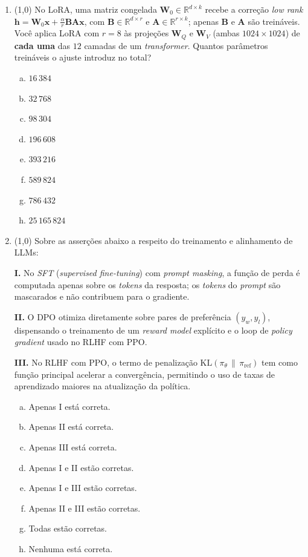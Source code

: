\documentclass[11pt,a4paper]{article}
\begin{document}
\begin{enumerate}[1)]

\item (1{,}0) No LoRA, uma matriz congelada $\mathbf{W}_0 \in \mathbb{R}^{d \times k}$ recebe a correção \textit{low rank} $\mathbf{h} = \mathbf{W}_0 \mathbf{x} + \frac{\alpha}{r} \mathbf{B} \mathbf{A} \mathbf{x}$, com $\mathbf{B} \in \mathbb{R}^{d \times r}$ e $\mathbf{A} \in \mathbb{R}^{r \times k}$; apenas $\mathbf{B}$ e $\mathbf{A}$ são treináveis. Você aplica LoRA com $r = 8$ às projeções $\mathbf{W}_Q$ e $\mathbf{W}_V$ (ambas $1024 \times 1024$) de \textbf{cada uma} das $12$ camadas de um \textit{transformer}. Quantos parâmetros treináveis o ajuste introduz no total?

\begin{enumerate}[a)]
    \item $16\,384$
    \item $32\,768$
    \item $98\,304$
    \item $196\,608$
    \item $393\,216$
    \item $589\,824$
    \item $786\,432$
    \item $25\,165\,824$
\end{enumerate}

\pagebreak
\item (1{,}0) Sobre as asserções abaixo a respeito do treinamento e alinhamento de LLMs:

\textbf{I.} No \textit{SFT} (\textit{supervised fine-tuning}) com \textit{prompt masking}, a função de perda é computada apenas sobre os \textit{tokens} da resposta; os \textit{tokens} do \textit{prompt} são mascarados e não contribuem para o gradiente.

\textbf{II.} O DPO otimiza diretamente sobre pares de preferência $(y_w, y_l)$, dispensando o treinamento de um \textit{reward model} explícito e o loop de \textit{policy gradient} usado no RLHF com PPO.

\textbf{III.} No RLHF com PPO, o termo de penalização $\mathrm{KL}(\pi_\theta \,\|\, \pi_{\text{ref}})$ tem como função principal acelerar a convergência, permitindo o uso de taxas de aprendizado maiores na atualização da política.

\begin{enumerate}[a)]
    \item Apenas I está correta.
    \item Apenas II está correta.
    \item Apenas III está correta.
    \item Apenas I e II estão corretas.
    \item Apenas I e III estão corretas.
    \item Apenas II e III estão corretas.
    \item Todas estão corretas.
    \item Nenhuma está correta.
\end{enumerate}


\end{enumerate}
\end{document}
